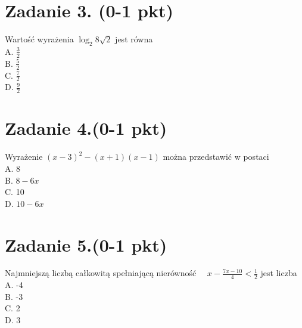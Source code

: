 \documentclass[10pt]{article}
\begin{document}
\section*{Zadanie 3. (0-1 pkt)}
Wartość wyrażenia \(\log _{2} 8 \sqrt{2}\) jest równa\\
A. \(\frac{3}{2}\)\\
B. \(\frac{5}{2}\)\\
C. \(\frac{7}{2}\)\\
D. \(\frac{9}{2}\)

\section*{Zadanie 4.(0-1 pkt)}
Wyrażenie \((x-3)^{2}-(x+1)(x-1)\) można przedstawić w postaci\\
A. 8\\
B. \(8-6 x\)\\
C. 10\\
D. \(10-6 x\)

\section*{Zadanie 5.(0-1 pkt)}
Najmniejszą liczbą całkowitą spełniającą nierówność \(\quad x-\frac{7 x-10}{4}<\frac{1}{2}\) jest liczba\\
A. -4\\
B. -3\\
C. 2\\
D. 3
\end{document}
